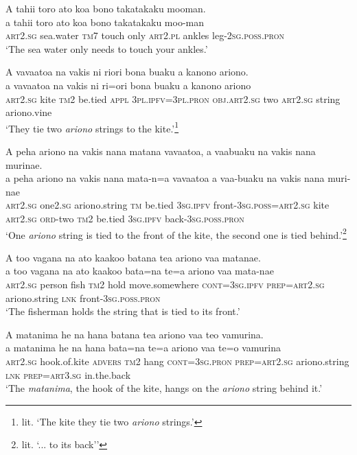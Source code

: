 \ea\label{ex:text27-7}
A tahii toro ato koa bono takatakaku mooman.\\
\gll a	tahii	toro	ato	koa	bono	takatakaku	moo-man\\
     \textsc{art}2.\textsc{sg}	sea.water	\textsc{tm}7	touch	only	\textsc{art}2.\textsc{pl}	ankles	leg-2\textsc{sg}.\textsc{poss}.\textsc{pron}\\
\glt `The sea water only needs to touch your ankles.'
\z

\ea\label{ex:text27-8}
A vavaatoa na vakis ni riori bona buaku a kanono ariono.\\
\gll a	vavaatoa	na	vakis	ni	ri=ori	bona	buaku	a	kanono	ariono\\
     \textsc{art}2.\textsc{sg}	kite	\textsc{tm}2	be.tied	\textsc{appl}	3\textsc{pl}.\textsc{ipfv}=3\textsc{pl}.\textsc{pron}	\textsc{obj}.\textsc{art}2.\textsc{sg}	two	\textsc{art}2.\textsc{sg}	string	ariono.vine\\
\glt `They tie two \textit{ariono} strings to the kite.'\footnote{lit. `The kite they tie two \textit{ariono} strings.'}
\z

\ea\label{ex:text27-9}
A peha ariono na vakis nana matana vavaatoa, a vaabuaku na vakis nana murinae.\\
\gll a	peha	ariono	na	vakis	nana	mata-n=a	vavaatoa	a	vaa-buaku	na	vakis	nana	muri-nae\\
     \textsc{art}2.\textsc{sg}	one2.\textsc{sg}	ariono.string	\textsc{tm}	be.tied	3\textsc{sg}.\textsc{ipfv}	front-3\textsc{sg}.\textsc{poss}=\textsc{art}2.\textsc{sg}	kite	\textsc{art}2.\textsc{sg}	\textsc{ord}-two	\textsc{tm}2	be.tied	3\textsc{sg}.\textsc{ipfv}	back-3\textsc{sg}.\textsc{poss}.\textsc{pron}\\
\glt `One \textit{ariono} string is tied to the front of the kite, the second one is tied behind.'\footnote{lit. `... to its back''}
\z

\ea\label{ex:text27-10}
A too vagana na ato kaakoo batana tea ariono vaa matanae.\\
\gll a	too	vagana	na	ato	kaakoo	bata=na	te=a	ariono	vaa	mata-nae\\
     \textsc{art}2.\textsc{sg}	person	fish	\textsc{tm}2	hold	move.somewhere	\textsc{cont}=3\textsc{sg}.\textsc{ipfv}	\textsc{prep}=\textsc{art}2.\textsc{sg}	ariono.string	\textsc{lnk}	front-3\textsc{sg}.\textsc{poss}.\textsc{pron}\\
\glt `The fisherman holds the string that is tied to its front.'
\z

\ea\label{ex:text27-11}
A matanima he na hana batana tea ariono vaa teo vamurina.\\
\gll a	matanima	he	na	hana	bata=na	te=a	ariono	vaa	te=o	vamurina\\
     \textsc{art}2.\textsc{sg}	hook.of.kite	\textsc{advers}	\textsc{tm}2	hang	\textsc{cont}=3\textsc{sg}.\textsc{pron}	\textsc{prep}=\textsc{art}2.\textsc{sg}	ariono.string	\textsc{lnk}	\textsc{prep}=\textsc{art}3.\textsc{sg}	in.the.back\\
\glt `The \textit{matanima}, the hook of the kite, hangs on the \textit{ariono} string behind it.'
\z


